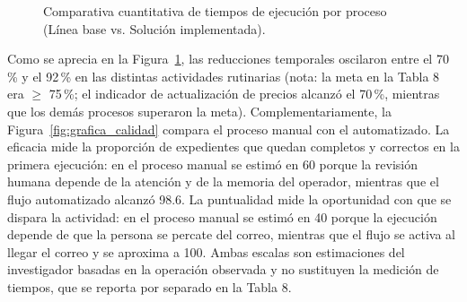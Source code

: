 \begin{figure}[H]
  \caption{Comparativa cuantitativa de tiempos de ejecución por proceso (Línea base vs. Solución implementada).}
  \label{fig:grafica_tiempos}
\end{figure}

Como se aprecia en la Figura~\ref{fig:grafica_tiempos}, las reducciones temporales oscilaron entre el 70\,\% y el 92\,\% en las distintas actividades rutinarias (nota: la meta en la Tabla 8 era $\ge$ 75\,\%; el indicador de actualización de precios alcanzó el 70\,\%, mientras que los demás procesos superaron la meta). Complementariamente, la Figura~\ref{fig:grafica_calidad} compara el proceso manual con el
automatizado. La eficacia mide la proporción de expedientes que quedan completos y correctos en la primera ejecución: en el proceso manual se estimó en 60 porque la revisión humana
depende de la atención y de la memoria del operador, mientras que el flujo automatizado alcanzó 98.6. La puntualidad mide la oportunidad con que se
dispara la actividad: en el proceso manual se estimó en 40 porque la ejecución depende de que la persona se percate del correo, mientras
que el flujo se activa al llegar el correo y se aproxima a 100. Ambas escalas son estimaciones del investigador basadas en la operación observada y no
sustituyen la medición de tiempos, que se reporta por separado en la Tabla 8.

